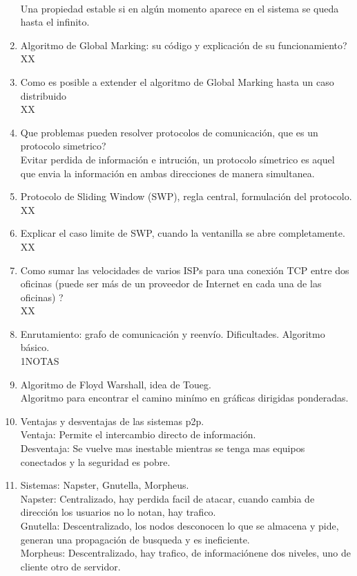 \documentclass[letterpaper, 12pt]{article}
\begin{document}
\begin{enumerate}
		\\ Una propiedad estable si en algún momento aparece en el sistema se queda hasta el infinito.
		\item Algoritmo de Global Marking: su código y explicación de su funcionamiento?
		\\XX
		\item Como es posible a extender el algoritmo de Global Marking hasta un caso distribuido
		\\XX
		\item Que problemas pueden resolver protocolos de comunicación, que es un protocolo simetrico?
		\\ Evitar perdida de información e intrución, un protocolo símetrico es aquel que envia la información en ambas direcciones de manera simultanea.
		\item Protocolo de Sliding Window (SWP), regla central, formulación del protocolo.
		\\XX
		\item Explicar el caso limite de SWP, cuando la ventanilla se abre completamente.
		\\XX
		\item Como sumar las velocidades de varios ISPs para una conexión TCP entre dos oficinas (puede ser más de un proveedor de Internet en cada una de las oficinas) ?
		\\XX		
		\item Enrutamiento: grafo de comunicación y reenvío. Dificultades. Algoritmo básico.
		\\1NOTAS
		\item Algoritmo de Floyd Warshall, idea de Toueg.
		\\ Algoritmo para encontrar el camino minímo en gráficas dirigidas ponderadas.
		\item Ventajas y desventajas de las sistemas p2p.
		\\Ventaja: Permite el intercambio directo de información.
		\\Desventaja: Se vuelve mas inestable mientras se tenga mas equipos conectados y la seguridad es pobre. 
		\item Sistemas: Napster, Gnutella, Morpheus.
		\\Napster: Centralizado, hay perdida facil de atacar, cuando cambia de dirección los usuarios no lo notan, hay trafico.
		\\Gnutella: Descentralizado, los nodos desconocen lo que se almacena y pide, generan una propagación de busqueda y es ineficiente.
		\\Morpheus: Descentralizado, hay trafico, de informaciónene dos niveles, uno de cliente otro de servidor.

\end{enumerate}
\end{document}
